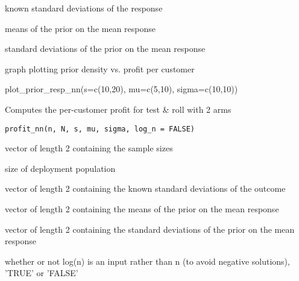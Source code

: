 \documentclass[a4paper]{book}
\begin{document}
%
\begin{Arguments}
\begin{ldescription}
\item[\code{s}] known standard deviations of the response

\item[\code{mu}] means of the prior on the mean response

\item[\code{sigma}] standard deviations of the prior on the mean response
\end{ldescription}
\end{Arguments}
%
\begin{Value}
graph plotting prior density vs. profit per customer
\end{Value}
%
\begin{Examples}
\begin{ExampleCode}
plot_prior_resp_nn(s=c(10,20), mu=c(5,10), sigma=c(10,10))
\end{ExampleCode}
\end{Examples}
%
\begin{Description}\relax
Computes the per-customer profit for test \& roll with 2 arms
\end{Description}
%
\begin{Usage}
\begin{verbatim}
profit_nn(n, N, s, mu, sigma, log_n = FALSE)
\end{verbatim}
\end{Usage}
%
\begin{Arguments}
\begin{ldescription}
\item[\code{n}] vector of length 2 containing the sample sizes

\item[\code{N}] size of deployment population

\item[\code{s}] vector of length 2 containing the known standard deviations of the outcome

\item[\code{mu}] vector of length 2 containing the means of the prior on the mean response

\item[\code{sigma}] vector of length 2 containing the standard deviations of the prior on the mean response

\item[\code{log\_n}] whether or not log(n) is an input rather than n (to avoid negative solutions), 'TRUE' or 'FALSE'
\end{ldescription}
\end{Arguments}
\end{document}
